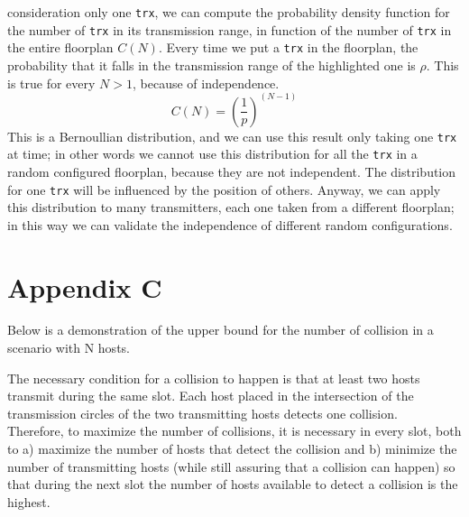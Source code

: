 consideration only one \texttt{trx}, we can compute the probability density
function for the number of \texttt{trx} in its transmission range, in function
of the number of \texttt{trx} in the entire floorplan $C(N)$. Every time we put
a \texttt{trx} in the floorplan, the probability that it falls in the
transmission range of the highlighted one is $\rho$. This is true for every
$N > 1$, because of independence.
\begin{equation*}
    C(N)= \left(\frac{1}{p}\right)^{\left( N-1 \right)}
\end{equation*}
This is a Bernoullian distribution, and we can use this result only taking one
\texttt{trx} at time; in other words we cannot use this distribution for all the
\texttt{trx} in a random configured floorplan, because they are not independent. 
The distribution for one \texttt{trx} will be influenced by the position of
others. Anyway, we can apply this distribution to many transmitters, each one
taken from a different floorplan; in this way we can validate the independence
of different random configurations.
\newpage
\section*{Appendix C}
\label{app:c}
Below is a demonstration of the upper bound for the number of collision in a scenario with N hosts.

\hfill \break
The necessary condition for a collision to happen is that at least two hosts transmit during the same slot. Each host placed in the intersection of the transmission circles of the two transmitting hosts detects one collision. \\
Therefore, to maximize the number of collisions, it is necessary in every slot, both to a) maximize the number of hosts that detect the collision and b) minimize the number of transmitting hosts (while still assuring that a collision can happen) so that during the next slot the number of hosts available to detect a collision is the highest.

